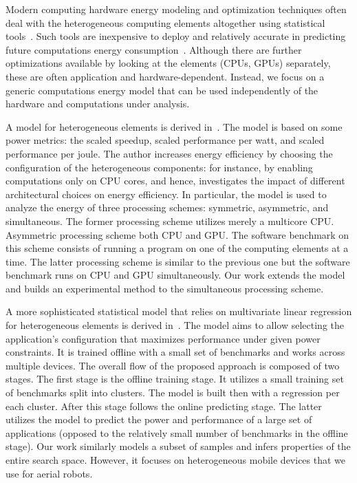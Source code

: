 Modern computing hardware energy modeling and optimization techniques often deal with the heterogeneous computing elements altogether using statistical tools~\citep{teamplay}. Such tools are inexpensive to deploy and relatively accurate in predicting future computations energy consumption~\citep{seewald2019coarse}. Although there are further optimizations available by looking at the elements (CPUs, GPUs) separately, these are often application and hardware-dependent. Instead, we focus on a generic computations energy model that can be used independently of the hardware and computations under analysis. 

A model for heterogeneous elements is derived in~\citep{marowka2017energy}. The model is based on some power metrics: the scaled speedup, scaled performance per watt, and scaled performance per joule. The author increases energy efficiency by choosing the configuration of the heterogeneous components: for instance, by enabling computations only on CPU cores, and hence, investigates the impact of different architectural choices on energy efficiency. In particular, the model is used to analyze the energy of three processing schemes: symmetric, asymmetric, and simultaneous. The former processing scheme utilizes merely a multicore CPU. Asymmetric processing scheme both CPU and GPU. The software benchmark on this scheme consists of running a program on one of the computing elements at a time. The latter processing scheme is similar to the previous one but the software benchmark runs on CPU and GPU simultaneously. Our work extends the model and builds an experimental method to the simultaneous processing scheme.

A more sophisticated statistical model that relies on multivariate linear regression for heterogeneous elements is derived in~\citep{bailey2014adaptive}. The model aims to allow selecting the application's configuration that maximizes performance under given power constraints. It is trained offline with a small set of benchmarks and works across multiple devices. The overall flow of the proposed approach is composed of two stages. The first stage is the offline training stage. It utilizes a small training set of benchmarks split into clusters. The model is built then with a regression per each cluster. After this stage follows the online predicting stage. The latter utilizes the model to predict the power and performance of a large set of applications (opposed to the relatively small number of benchmarks in the offline stage). Our work similarly models a subset of samples and infers properties of the entire search space. However, it focuses on heterogeneous mobile devices that we use for aerial robots.

